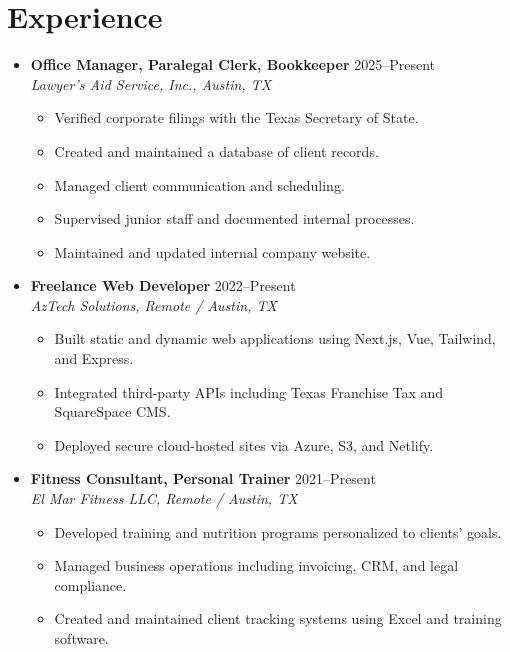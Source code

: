 \documentclass[letterpaper,10pt]{article}
\newcommand{\resumeItem}[1]{\item\small{#1}}
\begin{document}
\section*{Experience}
\begin{itemize}[leftmargin=0.15in]
  \item
    \textbf{Office Manager, Paralegal Clerk, Bookkeeper} \hfill 2025–Present \\
    \textit{Lawyer's Aid Service, Inc., Austin, TX}
    \begin{itemize}
      \resumeItem{Verified corporate filings with the Texas Secretary of State.}
      \resumeItem{Created and maintained a database of client records.}
      \resumeItem{Managed client communication and scheduling.}
      \resumeItem{Supervised junior staff and documented internal processes.}
      \resumeItem{Maintained and updated internal company website.}
    \end{itemize}

  \item
    \textbf{Freelance Web Developer} \hfill 2022–Present \\
    \textit{AzTech Solutions, Remote / Austin, TX}
    \begin{itemize}
      \resumeItem{Built static and dynamic web applications using Next.js, Vue, Tailwind, and Express.}
      \resumeItem{Integrated third-party APIs including Texas Franchise Tax and SquareSpace CMS.}
      \resumeItem{Deployed secure cloud-hosted sites via Azure, S3, and Netlify.}
    \end{itemize}

  \item
    \textbf{Fitness Consultant, Personal Trainer} \hfill 2021–Present \\
    \textit{El Mar Fitness LLC, Remote / Austin, TX}
    \begin{itemize}
      \resumeItem{Developed training and nutrition programs personalized to clients' goals.}
      \resumeItem{Managed business operations including invoicing, CRM, and legal compliance.}
      \resumeItem{Created and maintained client tracking systems using Excel and training software.}
    \end{itemize}
\end{itemize}

\end{document}
